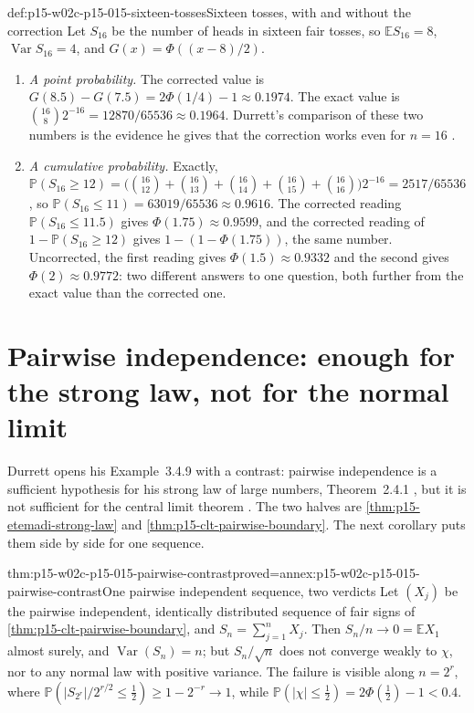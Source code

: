 \begin{hbexample}{def:p15-w02c-p15-015-sixteen-tosses}{Sixteen tosses, with and without the correction}
Let \(S_{16}\) be the number of heads in sixteen fair tosses, so
\(\mathbb ES_{16}=8\), \(\operatorname{Var}S_{16}=4\), and
\(G(x)=\Phi((x-8)/2)\).
\begin{enumerate}
\item \emph{A point probability.} The corrected value is
 \(G(8.5)-G(7.5)=2\Phi(1/4)-1\approx0.1974\). The exact value is
 \(\binom{16}8 2^{-16}=12870/65536\approx0.1964\). Durrett's comparison
 of these two numbers is the evidence he gives that the correction works
 even for \(n=16\) \cite[p.~146]{DurrettPTEAuthor2019}.
\item \emph{A cumulative probability.} Exactly,
 \(\mathbb P(S_{16}\geq12)=\bigl(\binom{16}{12}+\binom{16}{13}+\binom{16}{14}
 +\binom{16}{15}+\binom{16}{16}\bigr)2^{-16}=2517/65536\), so
 \(\mathbb P(S_{16}\leq11)=63019/65536\approx0.9616\). The corrected
 reading \(\mathbb P(S_{16}\leq11.5)\) gives \(\Phi(1.75)\approx0.9599\),
 and the corrected reading of \(1-\mathbb P(S_{16}\geq12)\) gives
 \(1-(1-\Phi(1.75))\), the same number. Uncorrected, the first reading
 gives \(\Phi(1.5)\approx0.9332\) and the second gives
 \(\Phi(2)\approx0.9772\): two different answers to one question, both
 further from the exact value than the corrected one.
\end{enumerate}
\end{hbexample}

\section{Pairwise independence: enough for the strong law, not for the normal limit}
\label{sec:p15-w02c-p15-015-pairwise}

Durrett opens his Example~3.4.9 with a contrast: pairwise independence
is a sufficient hypothesis for his strong law of large numbers,
Theorem~2.4.1 \cite[p.~76]{DurrettPTEAuthor2019}, but it is not
sufficient for the central limit theorem
\cite[p.~147]{DurrettPTEAuthor2019}. The two halves are
\cref{thm:p15-etemadi-strong-law} and
\cref{thm:p15-clt-pairwise-boundary}. The next corollary puts them
side by side for one sequence.

\begin{hbcorollary}{thm:p15-w02c-p15-015-pairwise-contrast}{proved=annex:p15-w02c-p15-015-pairwise-contrast}{One pairwise independent sequence, two verdicts}
Let \((X_j)\) be the pairwise independent, identically distributed
sequence of fair signs of \cref{thm:p15-clt-pairwise-boundary}, and
\(S_n=\sum_{j=1}^nX_j\). Then \(S_n/n\to0=\mathbb EX_1\) almost surely,
and \(\operatorname{Var}(S_n)=n\); but \(S_n/\sqrt n\) does not
converge weakly to \(\chi\), nor to any normal law with positive
variance. The failure is visible along \(n=2^r\), where
\(\mathbb P(|S_{2^r}|/2^{r/2}\leq\frac12)\geq1-2^{-r}\to1\), while
\(\mathbb P(|\chi|\leq\frac12)=2\Phi(\frac12)-1<0.4\).
\end{hbcorollary}

